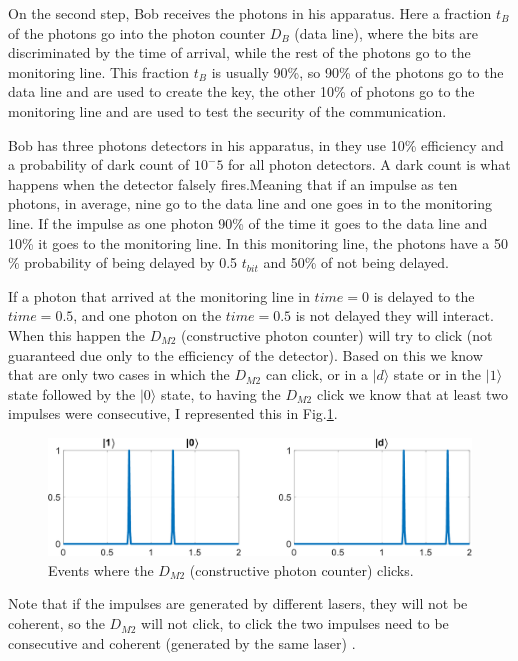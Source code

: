 \begin{refsection}
On the second step, Bob receives the photons in his apparatus. Here a fraction $t_B$ of the photons go into the photon counter $D_B$ (data line), where the bits are discriminated by the time of arrival, while the rest of the photons go to the monitoring line. This fraction $t_B$ is usually 90\%, so 90\% of the photons go to the data line and are used to create the key, the other 10\% of photons go to the monitoring line and are used to test the security of the communication.

Bob has three photons detectors in his apparatus, in \cite{gisin2004towards} they use 10\% efficiency and a probability of dark count of $10^-5$ for all photon detectors. A dark count is what happens when the detector falsely fires.Meaning that if an impulse as ten photons, in average, nine go to the data line and one goes in to the monitoring line. If the impulse as one photon 90\% of the time it goes to the data line and 10\% it goes to the monitoring line. In this monitoring line, the photons have a 50 \% probability of being delayed by 0.5 $t_{bit}$ and 50\% of not being delayed. 

If a photon that arrived at the monitoring line in $time=0$ is delayed to the $time=0.5$, and one photon on the $time=0.5$ is not delayed they will interact. When this happen the $D_{M2}$ (constructive photon counter) will try to click (not guaranteed due only to the efficiency of the detector). Based on this we know that are only two cases in which the $D_{M2}$ can click, or in a $|d\rangle$ state or in the $|1\rangle$ state followed by the $|0\rangle$ state, to having the $D_{M2}$ click we know that at least two impulses were consecutive, I represented this in Fig.\ref{fig:dm2}.

\begin{figure}[hbt!]
\centering
\includegraphics[width=1\linewidth]{./sdf/tq_76558_cow_protocol/slides/figures/S2.pdf}
\caption{Events where the $D_{M2}$ (constructive photon counter) clicks.}
\label{fig:dm2}
\end{figure}

Note that if the impulses are generated by different lasers, they will not be coherent, so the $D_{M2}$ will not click, to click the two impulses need to be consecutive and coherent (generated by the same laser) \cite{rusca2018security}.


\end{refsection}
